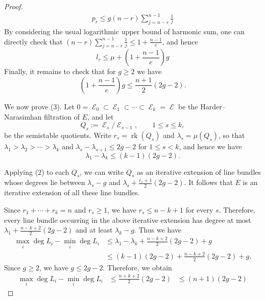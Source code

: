 \documentclass[11pt]{amsart}
\theoremstyle{definition}
\theoremstyle{remark}
\DeclareMathOperator{\E}{\mathcal{E}}
\numberwithin{equation}{section}
\begin{document}
\begin{proof}
\begin{align}
    p_r \leq g(n-r)\sum_{j=n-r}^{n-1}\frac{1}{j}
\end{align}
By considering the usual logarithmic upper bound of harmonic sum, one can directly check that $(n-r)\sum_{j=n-r}^{n-1}\frac{1}{j} \leq 1+\frac{n-1}{e}$, and hence $$l_r \leq \mu+ (1+\frac{n-1}{e})g$$ Finally, it remains to check that for $g\geq 2$ we have 
$$ (1+\frac{n-1}{e})g\leq  \frac{n+1}{2}(2g-2). $$

We now prove (3). Let $0=\E_0\subset \E_1\subset\cdots\subset \E_k=\E$
be the Harder--Narasimhan filtration of $E$, and let
$$
Q_s:=\E_s/\E_{s-1},\qquad 1\leq s\leq k,
$$
be the semistable quotients. Write $r_s=\operatorname{rk}(Q_s)$ and $\lambda_s=\mu(Q_s)$, so that $\lambda_1>\lambda_2>\cdots > \lambda_k$ and $\lambda_s-\lambda_{s+1}\leq 2g-2$
for $1\leq s<k$, and hence we have
$$
\lambda_1-\lambda_k\leq (k-1)(2g-2).
$$

Applying (2) to each $Q_s$, we can write $Q_s$ as an iterative extension of line bundles whose degrees lie between $\lambda_s-g$ and $\lambda_s+\frac{r_s+1}{2}(2g-2)$. It follows that $E$ is an iterative extension of all these line bundles.

Since $r_1+\cdots+r_k=n$ and $r_s\geq 1$, we have $r_s\leq n-k+1$ for every $s$. Therefore, every line bundle occurring in the above iterative extension has degree at most $\lambda_1+\frac{n-k+2}{2}(2g-2)$ and at least $\lambda_k-g$.
Thus we have 
$$
\begin{aligned}
\max_i{\deg L_i}-\min_i{\deg L_i}
&\leq
\lambda_1-\lambda_k
+\frac{n-k+2}{2}(2g-2)+g\
\\&\leq
(k-1)(2g-2)
+\frac{n-k+2}{2}(2g-2)+g.
\end{aligned}
$$
Since $g\geq 2$, we have $g\leq 2g-2$. Therefore, we obtain
$$\begin{aligned}
\max_i{\deg L_i}-\min_i{\deg L_i}
&\leq
\frac{n+k+2}{2}(2g-2)
&\leq (n+1)(2g-2)
\end{aligned}$$




\end{proof}








\end{document}
